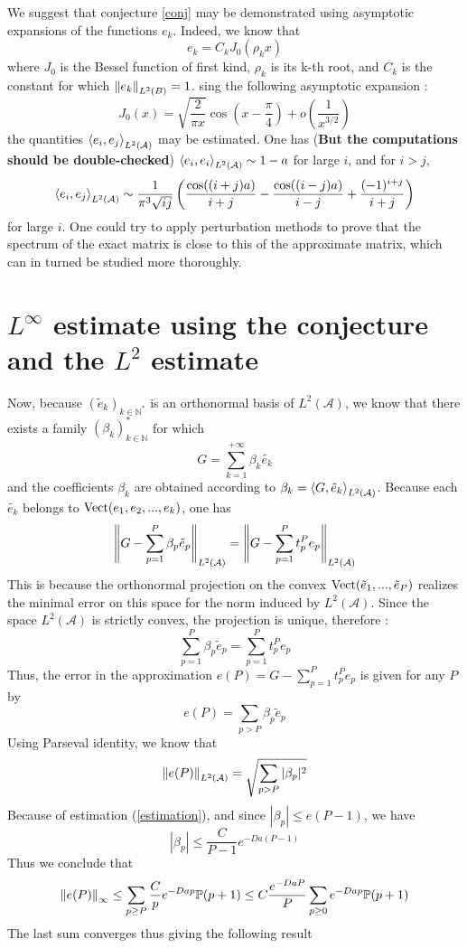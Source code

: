 \documentclass[11pt,a4paper]{article}
\begin{document}
We suggest that conjecture \ref{conj} may be demonstrated using asymptotic expansions of the functions $e_k$. Indeed, we know that 
\[e_k = C_k J_0(\rho_k x)\] 
where $J_0$ is the Bessel function of first kind, $\rho_k$ is its k-th root, and $C_k$ is the constant for which $\left\|e_k\right\|_{L^2(B)} = 1$. sing the following asymptotic expansion : 
\[J_0(x) = \sqrt{\dfrac{2}{\pi x}} \cos\left(x - \frac{\pi}{4}\right) + o\left( \dfrac{1}{x^{3/2}}\right)\]
the quantities $\left\langle e_i,e_j\right\rangle_{L^2(\mathcal{A})}$ may be estimated. One has (\textbf{But the computations should be double-checked})
$\left\langle e_i,e_i\right\rangle_{L^2(\mathcal{A})} \sim 1-a$ for large $i$, and for $i > j$, \[\left\langle e_i,e_j\right\rangle_{L^2(\mathcal{A})} \sim \dfrac{1}{\pi^3\sqrt{ij}} \left( \dfrac{\cos((i+j)a)}{i+j}- \dfrac{\cos((i-j)a)}{i-j} + \dfrac{(-1)^{i+j}}{i+j}\right)\] for large $i$. One could try to apply perturbation methods to prove that the spectrum of the exact matrix is close to this of the approximate matrix, which can in turned be studied more thoroughly. 

\section{$L^\infty$ estimate using the conjecture and the $L^2$ estimate}

Now, because $(\tilde{e}_k)_{k \in \mathbb{N}^*}$ is an orthonormal basis of $L^2(\mathcal{A})$, we know that there exists a family $(\beta_k)_{k \in \mathbb{N}}^*$ for which 
\[G = \sum_{k=1}^{+\infty} \beta_k \tilde{e_k}\] 
and the coefficients $\beta_k$ are obtained according to $\beta_k = \left\langle G,\tilde{e}_k\right\rangle_{L^2(\mathcal{A})}$. Because each $\tilde{e_k}$ belongs to $\textup{Vect}
(e_1,e_2,...,e_k)$, one has 
\[ \left\|G - \sum_{p=1}^P \beta_p \tilde{e}_p\right\|_{L^2(\mathcal{A})} = \left\|G - \sum_{p=1}^P t^P_p e_p\right\|_{L^2(\mathcal{A})}\]
This is because the orthonormal projection on the convex $\textup{Vect}(\tilde{e}_1,...,\tilde{e}_P)$ realizes the minimal error on this space for the norm induced by $L^2(\mathcal{A})$. Since the space $L^2(\mathcal{A})$ is strictly convex, the projection is unique, therefore : 
\[ \sum_{p=1}^P \beta_p \tilde{e}_p = \sum_{p=1}^{P}t_p^P e_p\]
Thus, the error in the approximation $e(P) = G - \displaystyle\sum_{p=1}^P t_p^P e_p$ is given for any $P$ by 
\[e(P) = \sum_{p > P} \beta_p \tilde{e}_p\]
Using Parseval identity, we know that 
\[\left\|e(P)\right\|_{L^2(\mathcal{A})} = \sqrt{\sum_{p>P} |\beta_p|^2}\]
Because of estimation (\ref{estimation}), and since $|\beta_p| \leq e(P-1)$, we have 
\[ |\beta_p| \leq \dfrac{C}{P-1}e^{-Da(P-1)}\]
Thus we conclude that 
\[ \left\|e(P)\right\|_{\infty} \leq \sum_{p\geq P}\dfrac{C}{p}e^{-Dap} \mathbb{P}(p+1) \leq C\dfrac{e^{-DaP}}{P}\sum_{p\geq 0}e^{-Dap} \mathbb{P}(p+1)\]
The last sum converges thus giving the following result 
\end{document}
